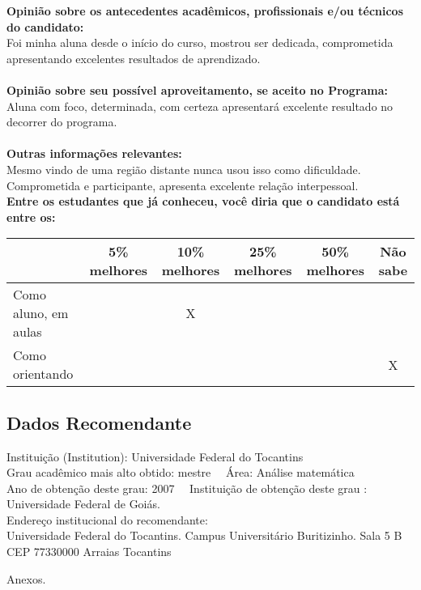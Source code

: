 \documentclass[11pt]{article}
\begin{document}
\textbf{Opinião sobre os antecedentes acadêmicos, profissionais e/ou técnicos do candidato:}
\\Foi minha aluna desde o início do curso, mostrou ser dedicada, comprometida apresentando excelentes resultados de aprendizado.\\
\\
\textbf{Opinião sobre seu possível aproveitamento, se aceito no Programa:}
\\Aluna com foco, determinada, com certeza apresentará excelente resultado no decorrer do programa.\\ 
\\
\textbf{Outras informações relevantes:} \\Mesmo vindo de uma região distante nunca usou isso como dificuldade. Comprometida e participante, apresenta excelente relação interpessoal.
\\[0.3cm]
\textbf{Entre os estudantes que já conheceu, você diria que o candidato está entre os:}
\\
\begin{tabular}{|l|c|c|c|c|c|}
\hline
 & 5\% melhores & 10\% melhores & 25\% melhores & 50\% melhores & Não sabe \\
\hline
Como aluno, em aulas &  & X &  &  & \\
\hline
Como orientando &  &  &  &  & X\\
\hline
\end{tabular}
\subsection*{Dados Recomendante} 
	Instituição (Institution): Universidade Federal do Tocantins
\\ 
	Grau acadêmico mais alto obtido: mestre
	\ \ Área: Análise matemática
	\\
	Ano de obtenção deste grau: 2007
	\ \ 
	Instituição de obtenção deste grau : Universidade Federal de Goiás.
	\\ 
	Endereço institucional do recomendante: \\ Universidade Federal do Tocantins.
Campus Universitário Buritizinho.
Sala 5  B
CEP 77330000 Arraias Tocantins 
\begin{center}
Anexos.
\end{center}
\end{document}
